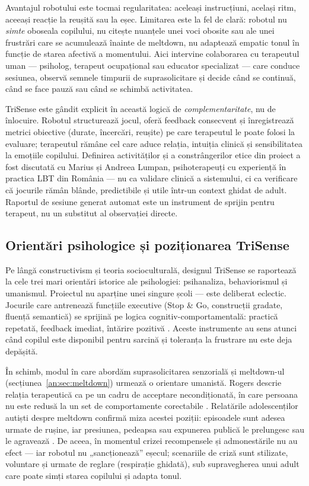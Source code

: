 Avantajul robotului este tocmai regularitatea: aceleași instrucțiuni, același ritm, aceeași reacție la reușită sau la eșec. Limitarea este la fel de clară: robotul nu \emph{simte} oboseala copilului, nu citește nuanțele unei voci obosite sau ale unei frustrări care se acumulează înainte de meltdown, nu adaptează empatic tonul în funcție de starea afectivă a momentului. Aici intervine colaborarea cu terapeutul uman — psiholog, terapeut ocupațional sau educator specializat — care conduce sesiunea, observă semnele timpurii de suprasolicitare și decide când se continuă, când se face pauză sau când se schimbă activitatea.

TriSense este gândit explicit în această logică de \emph{complementaritate}, nu de înlocuire. Robotul structurează jocul, oferă feedback consecvent și înregistrează metrici obiective (durate, încercări, reușite) pe care terapeutul le poate folosi la evaluare; terapeutul rămâne cel care aduce relația, intuiția clinică și sensibilitatea la emoțiile copilului. Definirea activităților și a constrângerilor etice din proiect a fost discutată cu Marius și Andreea Lumpan, psihoterapeuți cu experiență în practica LBT din România \cite{lumpanagerpres2025} — nu ca validare clinică a sistemului, ci ca verificare că jocurile rămân blânde, predictibile și utile într-un context ghidat de adult. Raportul de sesiune generat automat este un instrument de sprijin pentru terapeut, nu un substitut al observației directe.

\subsection{Orientări psihologice și poziționarea TriSense}
\label{sec:orientari-psihologice}

Pe lângă constructivism și teoria socioculturală, designul TriSense se raportează la cele trei mari orientări istorice ale psihologiei: psihanaliza, behaviorismul și umanismul. Proiectul nu aparține unei singure școli — este deliberat eclectic. Jocurile care antrenează funcțiile executive (Stop \& Go, construcții gradate, fluență semantică) se sprijină pe logica cognitiv-comportamentală: practică repetată, feedback imediat, întărire pozitivă \cite{diamond2013}. Aceste instrumente au sens atunci când copilul este disponibil pentru sarcină și toleranța la frustrare nu este deja depășită.

În schimb, modul în care abordăm suprasolicitarea senzorială și meltdown-ul (secțiunea~\ref{an:sec:meltdown}) urmează o orientare umanistă. Rogers descrie relația terapeutică ca pe un cadru de acceptare necondiționată, în care persoana nu este redusă la un set de comportamente corectabile \cite{rogers1951}. Relatările adolescenților autiști despre meltdown confirmă miza acestei poziții: episoadele sunt adesea urmate de rușine, iar presiunea, pedeapsa sau expunerea publică le prelungesc sau le agravează \cite{phung2021}. De aceea, în momentul crizei recompensele și admonestările nu au efect — iar robotul nu „sancționează” eșecul; scenariile de criză sunt stilizate, voluntare și urmate de reglare (respirație ghidată), sub supravegherea unui adult care poate simți starea copilului și adapta tonul.


